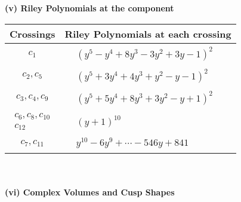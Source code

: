 \documentclass[1p]{elsarticle_modified}
\theoremstyle{definition}
\begin{document}
\newpage\renewcommand{\arraystretch}{1}
\flushleft \textbf{(v) Riley Polynomials at the component}\newline \\
\begin{tabular}{m{50pt}|m{274pt}}
Crossings & \hspace{64pt}Riley Polynomials at each crossing \\
\hline $$\begin{aligned}c_{1}\end{aligned}$$&$\begin{aligned}
&(y^5- y^4+8 y^3-3 y^2+3 y-1)^2
\end{aligned}$\\
\hline $$\begin{aligned}c_{2},c_{5}\end{aligned}$$&$\begin{aligned}
&(y^5+3 y^4+4 y^3+y^2- y-1)^2
\end{aligned}$\\
\hline $$\begin{aligned}c_{3},c_{4},c_{9}\end{aligned}$$&$\begin{aligned}
&(y^5+5 y^4+8 y^3+3 y^2- y+1)^2
\end{aligned}$\\
\hline $$\begin{aligned}c_{6},c_{8},c_{10}\\c_{12}\end{aligned}$$&$\begin{aligned}
&(y+1)^{10}
\end{aligned}$\\
\hline $$\begin{aligned}c_{7},c_{11}\end{aligned}$$&$\begin{aligned}
&y^{10}-6 y^9+\cdots-546 y+841
\end{aligned}$\\
\hline
\end{tabular}\\~\\
\newpage\flushleft \textbf{(vi) Complex Volumes and Cusp Shapes}
\end{document}
